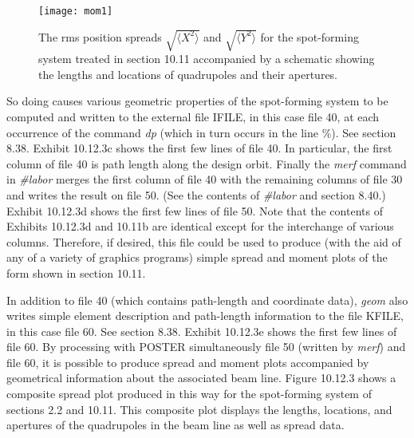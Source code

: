 \newpage
\begin{figure}[htp]
\setcounter{figure}{0}
  \centering
  \texttt{[image: mom1]}
  \caption{The rms position spreads $\sqrt{\langle X^2\rangle}$ and
$\sqrt{\langle Y^2\rangle}$ for the
spot-forming system treated in section 10.11 accompanied by a schematic
showing the lengths and locations of quadrupoles and their apertures.}
\end{figure}

\newpage
\noindent So doing causes various geometric properties of the spot-forming system to
be computed and written to the external file IFILE, in this case file 40, at each
occurrence of the command {\em dp} (which in turn occurs in the line \%).  See
section 8.38.  Exhibit 10.12.3c shows the first few lines of file 40.  In
particular, the first column of file 40 is path length along the design orbit.
Finally the {\em merf} command in {\em \#labor} merges the first column of file 40 with the
remaining columns of file 30 and writes the result on file 50.  (See the contents of
{\em \#labor} and section 8.40.)  Exhibit 10.12.3d shows the first few lines of
file 50.  Note that the contents of Exhibits 10.12.3d and 10.11b are identical
except for the interchange of various columns.  Therefore, if desired, this file
could be used to produce (with the aid of any of a variety of graphics programs)
simple spread and moment plots of the form shown in section 10.11.

In addition to file 40 (which contains path-length and coordinate data),
{\em geom} also writes simple element description and path-length information to
the file KFILE, in this case file 60.  See section 8.38.  Exhibit 10.12.3e
shows the first few lines of file 60.  By processing with POSTER simultaneously file
50 (written by {\em merf}) and file 60, it is possible to produce spread and moment
plots accompanied by geometrical information about the associated beam line.
Figure 10.12.3 shows a composite spread  plot produced in this way for the
spot-forming system of sections 2.2 and 10.11.  This composite plot displays the
lengths, locations, and apertures of the quadrupoles in the beam line as well as
spread data.

